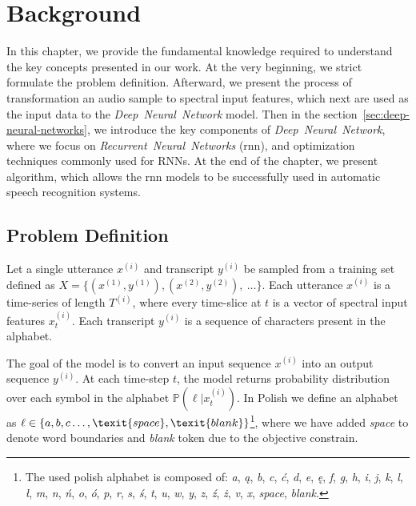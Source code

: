 
\chapter{Background}\label{ch:background}

In this chapter, we provide the fundamental knowledge required to understand
the key concepts presented in our work.
At the very beginning, we strict formulate the problem definition.
Afterward, we present the process of transformation an audio sample to spectral input features,
which next are used as the input data to the \textit{Deep~Neural~Network} model.
Then in the section~\ref{sec:deep-neural-networks}, we introduce the key components
of \textit{Deep~Neural~Network}, where we focus on \textit{Recurrent~Neural~Networks} (\acrshort{rnn}),
and optimization techniques commonly used for RNNs.
At the end of the chapter, we present~ algorithm,
which allows the \acrshort{rnn} models to be successfully used in automatic speech recognition systems.


\section{Problem Definition}\label{sec:problem-definition}

Let a single utterance $x^{(i)}$ and transcript $y^{(i)}$ be sampled from a training set defined as
$X=\{(x^{(1)}, y^{(1)}), (x^{(2)}, y^{(2)}), \ \dots\}$.
Each utterance $x^{(i)}$ is a time-series of length $T^{(i)}$, where every time-slice at $t$
is a vector of spectral input features $x_t^{(i)}$.
Each transcript $y^{(i)}$ is a sequence of characters present in the alphabet.

The goal of the model is to convert an input sequence $x^{(i)}$ into an output sequence $y^{(i)}$.
At each time-step $t$, the model returns probability distribution over each symbol in the alphabet
$\mathbb{P}(\ell | x^{(i)}_t)$.
In Polish we define an alphabet as $\ell \in \{ a, b, c \dots, \texit{space}, \texit{blank}\}$\footnote{
The used polish alphabet is composed of: \textit{a}, \textit{ą}, \textit{b}, \textit{c}, \textit{ć}, \textit{d}, \textit{e},
\textit{ę}, \textit{f}, \textit{g}, \textit{h}, \textit{i}, \textit{j}, \textit{k}, \textit{l}, \textit{ł}, \textit{m},
\textit{n}, \textit{ń}, \textit{o}, \textit{ó}, \textit{p}, \textit{r}, \textit{s}, \textit{ś}, \textit{t}, \textit{u},
\textit{w}, \textit{y}, \textit{z}, \textit{ź}, \textit{ż}, \textit{v}, \textit{x}, \textit{space}, \textit{blank}.
}, where we have added \textit{space} to denote word boundaries and \textit{blank} token due to the objective constrain.

